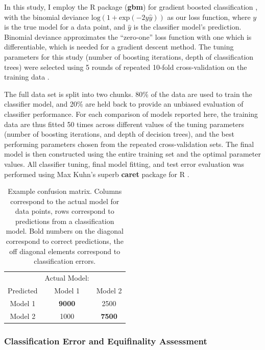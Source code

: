 \documentclass[10pt,letterpaper]{article}
\begin{document}
In this study, I employ the R package (\textbf{gbm}) for gradient
boosted classification \cite{ridgeway1999state}, with the binomial deviance \(\textrm{log}(1 + \textrm{exp}(-2y\hat{y}))\) as our loss function, where \(y\) is the true
model for a data point, and \(\hat{y}\) is the classifier model's
prediction.  Binomial deviance approximates the ``zero-one'' loss function with one which is differentiable, which is needed for a gradient descent method.  The tuning parameters for this study (number of boosting iterations, depth of classification trees) were selected using 5 rounds of repeated 10-fold cross-validation on the training data \cite{Kim:2009im, kuhn2013applied}.

The full data set is  split into two chunks. 80\% of the data are
used to train the classifier model, and 20\% are held back to provide an
unbiased evaluation of classifier performance.  For each comparison of models
reported here, the training data are thus fitted 50 times across
different values of the tuning parameters (number of boosting
iterations, and depth of decision trees), and the best performing
parameters chosen from the repeated cross-validation sets. The final model is then constructed using the entire
training set and the optimal parameter values. All classifier tuning,
final model fitting, and test error evaluation was performed using Max
Kuhn's superb \textbf{caret} package for R
\cite{kuhn2008building, kuhn2013applied}.

\begin{table}[ht]
\begin{tabular}{c|cc}
 & Actual Model: & \\
 Predicted &  Model 1 & Model  2 \\
  \hline
 Model  1 & \textbf{9000} & 2500 \\
   Model  2 & 1000 & \textbf{7500} \\
\end{tabular}
    \caption{Example confusion matrix.  Columns correspond to the actual model for data points, rows correspond to predictions from a classification model.  Bold numbers on the diagonal correspond to correct predictions, the off diagonal elements correspond to classification errors.}
    \label{tab:confusion-matrix}
\end{table}


\subsubsection{Classification Error and Equifinality
Assessment}\label{classification-error-and-equifinality-assessment}
\end{document}
